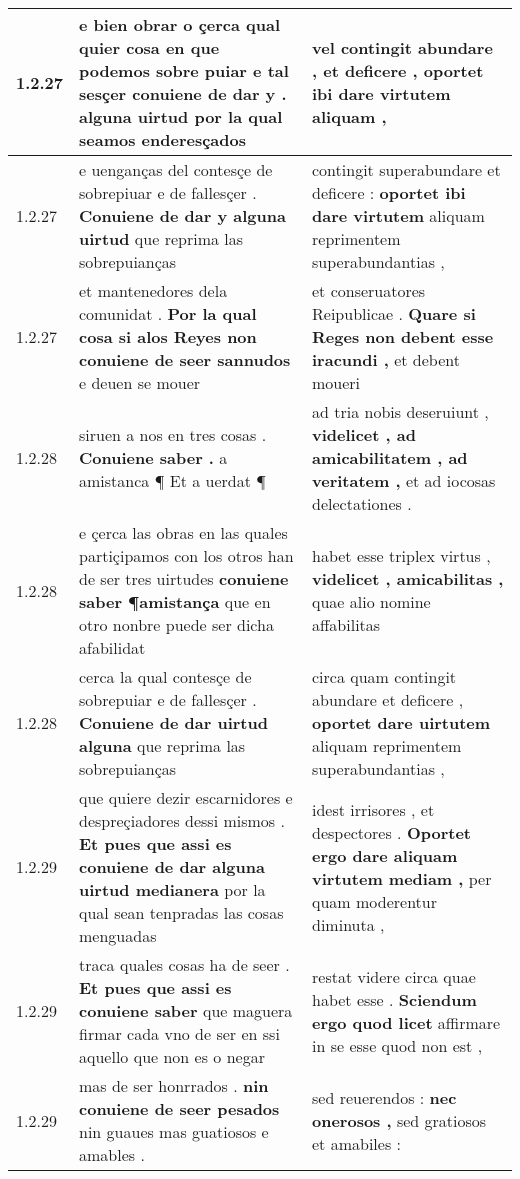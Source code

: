 \begin{tabular}{|p{1cm}|p{6.5cm}|p{6.5cm}|}
1.2.27 & e bien obrar o çerca qual quier cosa en que podemos sobre puiar \textbf{ e tal sesçer conuiene de dar y . } alguna uirtud por la qual seamos enderesçados & vel contingit abundare , \textbf{ et deficere , } oportet ibi dare virtutem aliquam , \\\hline
1.2.27 & e uenganças del contesçe de sobrepiuar e de fallesçer . \textbf{ Conuiene de dar y alguna uirtud } que reprima las sobrepuianças & contingit superabundare et deficere : \textbf{ oportet ibi dare virtutem } aliquam reprimentem superabundantias , \\\hline
1.2.27 & et mantenedores dela comunidat . \textbf{ Por la qual cosa si alos Reyes non conuiene de seer sannudos } e deuen se mouer & et conseruatores Reipublicae . \textbf{ Quare si Reges non debent esse iracundi , } et debent moueri \\\hline
1.2.28 & siruen a nos en tres cosas . \textbf{ Conuiene saber . } a amistanca ¶ Et a uerdat ¶ & ad tria nobis deseruiunt , \textbf{ videlicet , ad amicabilitatem , ad veritatem , } et ad iocosas delectationes . \\\hline
1.2.28 & e çerca las obras en las quales partiçipamos con los otros han de ser tres uirtudes \textbf{ conuiene saber ¶amistança } que en otro nonbre puede ser dicha afabilidat & habet esse triplex virtus , \textbf{ videlicet , amicabilitas , } quae alio nomine affabilitas \\\hline
1.2.28 & cerca la qual contesçe de sobrepuiar e de fallesçer . \textbf{ Conuiene de dar uirtud alguna } que reprima las sobrepuianças & circa quam contingit abundare et deficere , \textbf{ oportet dare uirtutem } aliquam reprimentem superabundantias , \\\hline
1.2.29 & que quiere dezir escarnidores e despreçiadores dessi mismos . \textbf{ Et pues que assi es conuiene de dar alguna uirtud medianera } por la qual sean tenpradas las cosas menguadas & idest irrisores , et despectores . \textbf{ Oportet ergo dare aliquam virtutem mediam , } per quam moderentur diminuta , \\\hline
1.2.29 & traca quales cosas ha de seer . \textbf{ Et pues que assi es conuiene saber } que maguera firmar cada vno de ser en ssi aquello que non es o negar & restat videre circa quae habet esse . \textbf{ Sciendum ergo quod licet } affirmare in se esse quod non est , \\\hline
1.2.29 & mas de ser honrrados . \textbf{ nin conuiene de seer pesados } nin guaues mas guatiosos e amables . & sed reuerendos : \textbf{ nec onerosos , } sed gratiosos et amabiles : \\\hline

\end{tabular}
